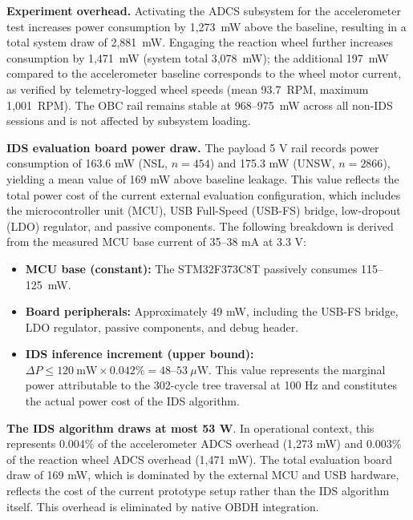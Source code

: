 \textbf{Experiment overhead.} Activating the ADCS subsystem for the accelerometer test increases power consumption by 1,273~mW above the baseline, resulting in a total system draw of 2,881~mW. Engaging the reaction wheel further increases consumption by 1,471~mW (system total 3,078~mW); the additional 197~mW compared to the accelerometer baseline corresponds to the wheel motor current, as verified by telemetry-logged wheel speeds (mean 93.7~RPM, maximum 1,001~RPM). The OBC rail remains stable at 968--975~mW across all non-IDS sessions and is not affected by subsystem loading.

\textbf{IDS evaluation board power draw.} The payload 5 V rail records power consumption of 163.6 mW (NSL, $n{=}454$) and 175.3 mW (UNSW, $n{=}2866$), yielding a mean value of 169 mW above baseline leakage. This value reflects the total power cost of the current external evaluation configuration, which includes the microcontroller unit (MCU), USB Full-Speed (USB-FS) bridge, low-dropout (LDO) regulator, and passive components. The following breakdown is derived from the measured MCU base current of 35–38 mA at 3.3 V:
\begin{itemize}
    \item \textbf{MCU base (constant):} The STM32F373C8T passively consumes 115--125~mW.
    \item \textbf{Board peripherals:} Approximately 49 mW, including the USB-FS bridge, LDO regulator, passive components, and debug header.
    \item \textbf{IDS inference increment (upper bound):} $\Delta P \leq 120~\text{mW} \times 0.042\% = 48\text{--}53~\mu\text{W}$. This value represents the marginal power attributable to the 302-cycle tree traversal at 100 Hz and constitutes the actual power cost of the IDS algorithm.
\end{itemize}

\textbf{The IDS algorithm draws at most 53 \textmu W}. In operational context, this represents 0.004\% of the accelerometer ADCS overhead (1,273 mW) and 0.003\% of the reaction wheel ADCS overhead (1,471 mW). The total evaluation board draw of 169 mW, which is dominated by the external MCU and USB hardware, reflects the cost of the current prototype setup rather than the IDS algorithm itself. This overhead is eliminated by native OBDH integration.

